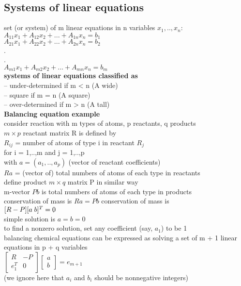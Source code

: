 \subsection{Systems of linear equations}
\textbullet set (or system) of m linear equations in n variables $x_1,.., x_n$: \\
$A_{11}x_1 + A_{12}x_2 + ... + A_{1n}x_n = b_1$\\
$A_{21}x_1 + A_{22}x_2 + ... + A_{2n}x_n = b_2$\\
.\\
.\\
$A_{m1}x_1 + A_{m2}x_2 + ... + A_{mn}x_n = b_m$\\

\textbullet \textbf{systems of linear equations classified as}\\
\thickspace -- under-determined if m < n (A wide)\\
\thickspace -- square if m = n (A square)\\
\thickspace -- over-determined if m > n (A tall)\\

\textbf{Balancing equation example}\\
\textbullet consider reaction with m types of atoms, p reactants, q products\\
\textbullet $m \times p$ reactant matrix R is defined by\\
$R_{ij}$ = number of atoms of type i in reactant $R_j$\\
for i = 1,..,m and j = 1,..,p\\
\textbullet with $a = (a_1,..,a_p)$ (vector of reactant coefficients)\\
$Ra$ = (vector of) total numbers of atoms of each type in reactants\\
\textbullet define product $m \times q$ matrix P in similar way\\
\textbullet m-vector $Pb$ is total numbers of atoms of each type in products\\
\textbullet conservation of mass is $Ra = Pb$
\textbullet  conservation of mass is\\
$[R - P][a\thickspace b]^T = 0$\\
\textbullet simple solution is $a = b = 0$\\
\textbullet to find a nonzero solution, set any coefficient (say, $a_1$) to be 1\\
\textbullet balancing chemical equations can be expressed as solving a set of m + 1 linear equations in p + q variables \\
$
\begin{bmatrix}
    R & -P \\
    e_1^T & 0
    
\end{bmatrix} 
\begin{bmatrix}
    a \\
    b
\end{bmatrix}=e_{m+1}
$\\
(we ignore here that $a_i$ and $b_i$ should be nonnegative integers)